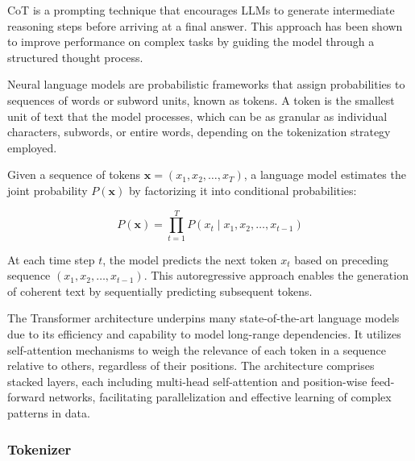 
 \label{app:technicality}

 \label{sec:icl-info}

 CoT \citep{weiChainofThoughtPromptingElicits2022} is a prompting technique that encourages LLMs to generate intermediate reasoning steps before arriving at a final answer. This approach has been shown to improve performance on complex tasks by guiding the model through a structured thought process.

 \label{app:llm-transformer}

Neural language models are probabilistic frameworks that assign probabilities to sequences of words or subword units, known as tokens. A token is the smallest unit of text that the model processes, which can be as granular as individual characters, subwords, or entire words, depending on the tokenization strategy employed.

Given a sequence of tokens \( \mathbf{x} = (x_1, x_2, \ldots, x_T) \), a language model estimates the joint probability \( P(\mathbf{x}) \) by factorizing it into conditional probabilities:

\begin{equation}
P(\mathbf{x}) = \prod_{t=1}^T P(x_t \mid x_1, x_2, \ldots, x_{t-1})
\end{equation}

At each time step \( t \), the model predicts the next token \( x_t \) based on preceding sequence \( (x_1, x_2, \ldots, x_{t-1}) \). This autoregressive approach enables the generation of coherent text by sequentially predicting subsequent tokens.

The Transformer architecture underpins many state-of-the-art language models due to its efficiency and capability to model long-range dependencies. It utilizes self-attention mechanisms to weigh the relevance of each token in a sequence relative to others, regardless of their positions. The architecture comprises stacked layers, each including multi-head self-attention and position-wise feed-forward networks, facilitating parallelization and effective learning of complex patterns in data.

\subsubsection{Tokenizer} \label{app:tokenizer}

